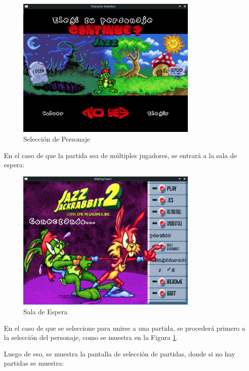 \documentclass[titlepage,a4paper]{article}
\begin{document}
\begin{figure}[H]
  \centering
  \includegraphics[width=0.8\textwidth]{images/Lobby/CharacterSelection.png}
  \caption{Selección de Personaje}
  \label{fig:character}
\end{figure}

En el caso de que la partida sea de múltiples jugadores, se entrará a la sala de espera:

\begin{figure}[H]
  \centering
  \includegraphics[width=0.8\textwidth]{images/Lobby/WaitingRoom.png}
  \caption{Sala de Espera}
  \label{fig:waiting-room}
\end{figure}

En el caso de que se seleccione para unirse a una partida, se procederá primero a la selección del personaje, como se muestra en la Figura \ref{fig:character}.

Luego de eso, se muestra la pantalla de selección de partidas, donde si no hay partidas se muestra:
\end{document}
